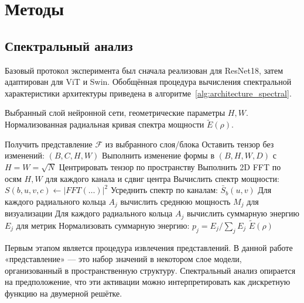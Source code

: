 \chapter{Методы}

\section{Спектральный анализ}

Базовый протокол эксперимента был сначала реализован для ResNet18, затем адаптирован для ViT и Swin. Обобщённая процедура вычисления спектральной характеристики архитектуры приведена в алгоритме~\ref{alg:architecture_spectral}.

\begin{algorithm}[h]
\caption{Обобщённая процедура вычисления спектральной характеристики архитектуры}
\label{alg:architecture_spectral}
\vspace{1em}
\begin{algorithmic}[1]
\Require Выбранный слой нейронной сети, геометрические параметры $H, W$.
\Ensure Нормализованная радиальная кривая спектра мощности $\tilde E(\rho)$.
\vspace{1em}

\State Получить представление $\mathcal{F}$ из выбранного слоя/блока
    \State Оставить тензор без изменений: $(B,C,H,W)$
    \State Выполнить изменение формы в $(B, H, W, D)$ с $H=W=\sqrt{N}$
\EndIf
\State Центрировать тензор по пространству
\State Выполнить 2D FFT по осям $H,W$ для каждого канала и сдвиг центра 
\State Вычислить спектр мощности: $S(b, u, v, c) \gets |FFT(\dots)|^2$
\State Усреднить спектр по каналам: $\bar{S}_b(u, v)$
\State Для каждого радиального кольца $A_j$ вычислить среднюю мощность $M_j$ для визуализации
\State Для каждого радиального кольца $A_j$ вычислить суммарную энергию $E_j$ для метрик
\State Нормализовать суммарную энергию: $p_j = E_j / \sum_j E_j$
\State \Return $\tilde E(\rho)$
\end{algorithmic}
\end{algorithm}

Первым этапом является процедура извлечения представлений. В данной работе «представление» — это набор значений в некотором слое модели, организованный в пространственную структуру. Спектральный анализ опирается на предположение, что эти активации можно интерпретировать как дискретную функцию на двумерной решётке.

